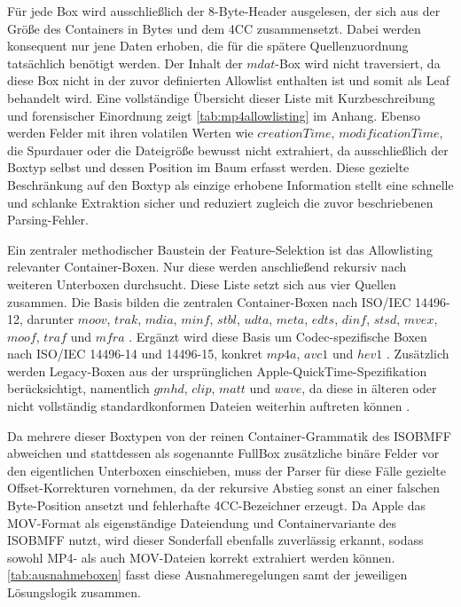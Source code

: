 Für jede Box wird ausschließlich der 8-Byte-Header ausgelesen, der sich aus der Größe des Containers in Bytes und dem 4CC zusammensetzt. Dabei werden konsequent nur jene Daten erhoben, die für die spätere Quellenzuordnung tatsächlich benötigt werden. Der Inhalt der \(mdat\)-Box wird nicht traversiert, da diese Box nicht in der zuvor definierten Allowlist enthalten ist und somit als Leaf behandelt wird. Eine vollständige Übersicht dieser Liste mit Kurzbeschreibung und forensischer Einordnung zeigt \cref{tab:mp4allowlisting} im Anhang. Ebenso werden Felder mit ihren volatilen Werten wie \(creationTime\), \(modificationTime\), die Spurdauer oder die Dateigröße bewusst nicht extrahiert, da ausschließlich der Boxtyp selbst und dessen Position im Baum erfasst werden. Diese gezielte Beschränkung auf den Boxtyp als einzige erhobene Information stellt eine schnelle und schlanke Extraktion sicher und reduziert zugleich die zuvor beschriebenen Parsing-Fehler.

Ein zentraler methodischer Baustein der Feature-Selektion ist das Allowlisting relevanter Container-Boxen. Nur diese werden anschließend rekursiv nach weiteren Unterboxen durchsucht. Diese Liste setzt sich aus vier Quellen zusammen. Die Basis bilden die zentralen Container-Boxen nach ISO/IEC 14496-12, darunter \(moov\), \(trak\), \(mdia\), \(minf\), \(stbl\), \(udta\), \(meta\), \(edts\), \(dinf\), \(stsd\), \(mvex\), \(moof\), \(traf\) und \(mfra\) \cite[Kap. 8]{iso_14496-12_2022}. Ergänzt wird diese Basis um Codec-spezifische Boxen nach ISO/IEC 14496-14 und 14496-15, konkret \(mp4a\), \(avc1\) und \(hev1\) \cite{iso_14496-14_2020}\cite{iso_14496-15_2024}. Zusätzlich werden Legacy-Boxen aus der ursprünglichen Apple-QuickTime-Spezifikation berücksichtigt, namentlich \(gmhd\), \(clip\), \(matt\) und \(wave\), da diese in älteren oder nicht vollständig standardkonformen Dateien weiterhin auftreten können \cite{apple_quicktime_2001}. 

Da mehrere dieser Boxtypen von der reinen Container-Grammatik des ISOBMFF abweichen und stattdessen als sogenannte FullBox zusätzliche binäre Felder vor den eigentlichen Unterboxen einschieben, muss der Parser für diese Fälle gezielte Offset-Korrekturen vornehmen, da der rekursive Abstieg sonst an einer falschen Byte-Position ansetzt und fehlerhafte 4CC-Bezeichner erzeugt. Da Apple das MOV-Format als eigenständige Dateiendung und Containervariante des ISOBMFF nutzt, wird dieser Sonderfall ebenfalls zuverlässig erkannt, sodass sowohl MP4- als auch MOV-Dateien korrekt extrahiert werden können. \cref{tab:ausnahmeboxen} fasst diese Ausnahmeregelungen samt der jeweiligen Lösungslogik zusammen.

